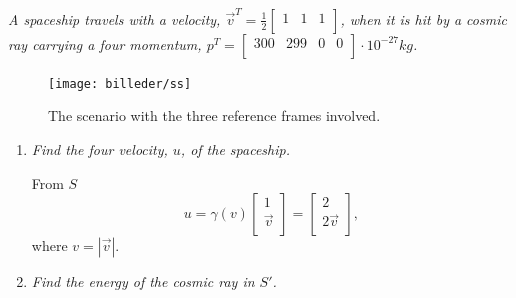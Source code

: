 \begin{example}
	\emph{A spaceship travels with a velocity, $\vec{v}^T=\frac{1}{2}\begin{bmatrix}
			1 & 1 & 1\\
		\end{bmatrix}$, when it is hit by a cosmic ray carrying a four momentum, $p^T=\begin{bmatrix}
			300 & 299 & 0& 0\\
		\end{bmatrix}\cdot10^{-27}kg$.}
	\begin{figure}[H]
		\captionsetup{width=1\textwidth}
		\centering
		\texttt{[image: billeder/ss]}
		\caption{The scenario with the three reference frames involved.}
		\label{fig:ss}
	\end{figure} 
	\begin{enumerate}
		\item \emph{Find the four velocity, $u$, of the spaceship.}
		
		From $S$
		\begin{equation}
			u=\gamma(v)\begin{bmatrix}
				1 \\
				\vec{v}\\
			\end{bmatrix}=\begin{bmatrix}
				2 \\
				2\vec{v}\\
			\end{bmatrix},
		\end{equation} 
		where $v=|\vec{v}|$.
		
		\item \emph{Find the energy of the cosmic ray in $S'$.}
		

\end{enumerate}
\end{example}
